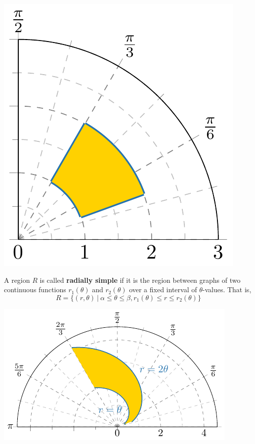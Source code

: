     
\begin{center}
        \includegraphics{chapters/4-IntegrationRn/figures/figures-polarrectangle.pdf}
    \end{center}

\begin{definition}
A region $R$ is called \textbf{radially simple} if it is the region between graphs of two continuous functions $r_1(\theta)$ and $r_2(\theta)$ over a fixed interval of $\theta$-values.  That is, 
$$R = \{ (r, \theta) \ | \ \alpha \leq \theta \leq \beta, r_1(\theta) \leq r \leq r_2(\theta)\}$$
\end{definition}

\begin{example}
\begin{center}
        \includegraphics{chapters/4-IntegrationRn/figures/figures-radiallysimple.pdf}
\end{center}
\end{example}

